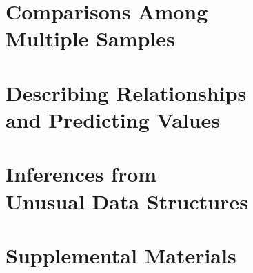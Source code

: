 \documentclass{bookTemplate}
\begin{document}
\part{Comparisons Among\\ Multiple Samples}






\part{Describing Relationships\\ and Predicting Values}






\part{Inferences from\\ Unusual Data Structures}





\part{Supplemental Materials}






\end{document}
